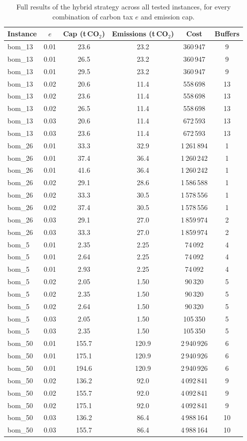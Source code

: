 \begin{table}[!htbp]\centering\small
\caption{Full results of the hybrid strategy across all tested instances, for every combination of carbon tax $e$ and emission cap.}\label{tab:hybridfull}
\begin{tabular}{lccccc}
\toprule
Instance & $e$ & Cap (t\,CO$_2$) & Emissions (t\,CO$_2$) & Cost & Buffers\\
\midrule
bom\_13 & 0.01 & 23.6 & 23.2 & 360\,947 & 9 \\
bom\_13 & 0.01 & 26.5 & 23.2 & 360\,947 & 9 \\
bom\_13 & 0.01 & 29.5 & 23.2 & 360\,947 & 9 \\
bom\_13 & 0.02 & 20.6 & 11.4 & 558\,698 & 13 \\
bom\_13 & 0.02 & 23.6 & 11.4 & 558\,698 & 13 \\
bom\_13 & 0.02 & 26.5 & 11.4 & 558\,698 & 13 \\
bom\_13 & 0.03 & 20.6 & 11.4 & 672\,593 & 13 \\
bom\_13 & 0.03 & 23.6 & 11.4 & 672\,593 & 13 \\
bom\_26 & 0.01 & 33.3 & 32.9 & 1\,261\,894 & 1 \\
bom\_26 & 0.01 & 37.4 & 36.4 & 1\,260\,242 & 1 \\
bom\_26 & 0.01 & 41.6 & 36.4 & 1\,260\,242 & 1 \\
bom\_26 & 0.02 & 29.1 & 28.6 & 1\,586\,588 & 1 \\
bom\_26 & 0.02 & 33.3 & 30.5 & 1\,578\,556 & 1 \\
bom\_26 & 0.02 & 37.4 & 30.5 & 1\,578\,556 & 1 \\
bom\_26 & 0.03 & 29.1 & 27.0 & 1\,859\,974 & 2 \\
bom\_26 & 0.03 & 33.3 & 27.0 & 1\,859\,974 & 2 \\
bom\_5 & 0.01 & 2.35 & 2.25 & 74\,092 & 4 \\
bom\_5 & 0.01 & 2.64 & 2.25 & 74\,092 & 4 \\
bom\_5 & 0.01 & 2.93 & 2.25 & 74\,092 & 4 \\
bom\_5 & 0.02 & 2.05 & 1.50 & 90\,320 & 5 \\
bom\_5 & 0.02 & 2.35 & 1.50 & 90\,320 & 5 \\
bom\_5 & 0.02 & 2.64 & 1.50 & 90\,320 & 5 \\
bom\_5 & 0.03 & 2.05 & 1.50 & 105\,350 & 5 \\
bom\_5 & 0.03 & 2.35 & 1.50 & 105\,350 & 5 \\
bom\_50 & 0.01 & 155.7 & 120.9 & 2\,940\,926 & 6 \\
bom\_50 & 0.01 & 175.1 & 120.9 & 2\,940\,926 & 6 \\
bom\_50 & 0.01 & 194.6 & 120.9 & 2\,940\,926 & 6 \\
bom\_50 & 0.02 & 136.2 & 92.0 & 4\,092\,841 & 9 \\
bom\_50 & 0.02 & 155.7 & 92.0 & 4\,092\,841 & 9 \\
bom\_50 & 0.02 & 175.1 & 92.0 & 4\,092\,841 & 9 \\
bom\_50 & 0.03 & 136.2 & 86.4 & 4\,988\,164 & 10 \\
bom\_50 & 0.03 & 155.7 & 86.4 & 4\,988\,164 & 10 \\
\bottomrule
\end{tabular}
\end{table}
